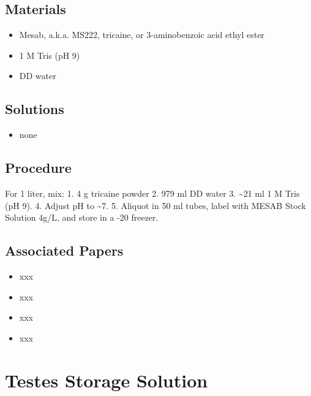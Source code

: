 \documentclass[
  letterpaper,
  DIV=11,
  numbers=noendperiod]{scrreprt}
\providecommand{\tightlist}{%
  \setlength{\itemsep}{0pt}\setlength{\parskip}{0pt}}\usepackage{longtable,booktabs,array}
\begin{document}
\hypertarget{materials-90}{%
\section{Materials}\label{materials-90}}

\begin{itemize}
\tightlist
\item
  Mesab, a.k.a. MS222, tricaine, or 3-aminobenzoic acid ethyl ester
\item
  1 M Tris (pH 9)
\item
  DD water
\end{itemize}

\hypertarget{solutions-81}{%
\section{Solutions}\label{solutions-81}}

\begin{itemize}
\tightlist
\item
  none
\end{itemize}

\hypertarget{procedure-90}{%
\section{Procedure}\label{procedure-90}}

For 1 liter, mix: 1. 4 g tricaine powder 2. 979 ml DD water 3.
\textasciitilde21 ml 1 M Tris (pH 9). 4. Adjust pH to \textasciitilde7.
5. Aliquot in 50 ml tubes, label with MESAB Stock Solution 4g/L, and
store in a -20 freezer.

\hypertarget{associated-papers-64}{%
\section{Associated Papers}\label{associated-papers-64}}

\begin{itemize}
\tightlist
\item
  xxx
\item
  xxx
\item
  xxx
\item
  xxx
\end{itemize}

\hypertarget{sec-recipe-testes_solution}{%
\chapter{Testes Storage Solution}\label{sec-recipe-testes_solution}}
\end{document}

